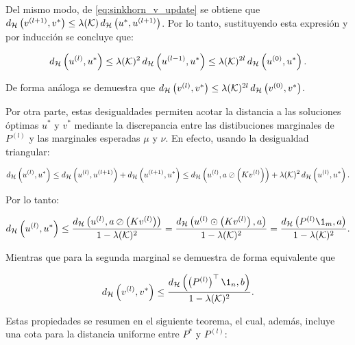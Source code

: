 Del mismo modo, de \eqref{eq:sinkhorn_v_update} se obtiene que $d_{\mathcal{H}}\left(v^{(l+1)},v^*\right) \leq \lambda(\mathcal{K})\, d_{\mathcal{H}}\left(u^*,u^{(l+1)}\right)$. Por lo tanto, sustituyendo esta expresión y por inducción se concluye que:

\begin{equation*}
	d_{\mathcal{H}}\left(u^{(l)},u^*\right)
	\leq \lambda(\mathcal{K})^2\, d_{\mathcal{H}}\left(u^{(l-1)},u^*\right)
	\leq \lambda(\mathcal{K})^{2l}\, d_{\mathcal{H}}\left(u^{(0)},u^*\right).
\end{equation*}

De forma análoga se demuestra que $d_{\mathcal{H}}\left(v^{(l)},v^*\right) \leq \lambda(\mathcal{K})^{2l}\, d_{\mathcal{H}}\left(v^{(0)},v^*\right)$.

Por otra parte, estas desigualdades permiten acotar la distancia a las soluciones óptimas $u^*$ y $v^*$ mediante la discrepancia entre las distibuciones marginales de $P^{(l)}$ y las marginales esperadas $\mu$ y $\nu$. En efecto, usando la desigualdad triangular:

\begin{equation*}
	d_{\mathcal{H}}\left(u^{(l)},u^*\right)
	\leq d_{\mathcal{H}}\left(u^{(l)},u^{(l+1)}\right) + d_{\mathcal{H}}\left(u^{(l+1)},u^*\right)
	\leq d_{\mathcal{H}}\left(u^{(l)},a\oslash \left(Kv^{(l)}\right)\right) + \lambda(\mathcal{K})^2\, d_{\mathcal{H}}\left(u^{(l)},u^*\right).
\end{equation*}

Por lo tanto:

\begin{equation*}
	\hmetric{u^{(l)}}{u^*}
	\leq \frac{\hmetric{u^{(l)}}{a\oslash \parent{Kv^{(l)}}}}{1-\lambda(\gibbs)^2}
	= \frac{\hmetric{u^{(l)}\odot \parent{Kv^{(l)}}}{a}}{1-\lambda(\gibbs)^2}
	= \frac{\hmetric{P^{(l)}\1_m}{a}}{1-\lambda(\gibbs)^2}.
\end{equation*}

Mientras que para la segunda marginal se demuestra de forma equivalente que

\begin{equation*}
	\hmetric{v^{(l)}}{v^*}
	\leq \frac{\hmetric{\parent{P^{(l)}}^\top\1_n}{b}}{1-\lambda(\gibbs)^2}.
\end{equation*}


Estas propiedades se resumen en el siguiente teorema, el cual, además, incluye una cota para la distancia uniforme entre $P^*$ y $P^{(l)}$:

